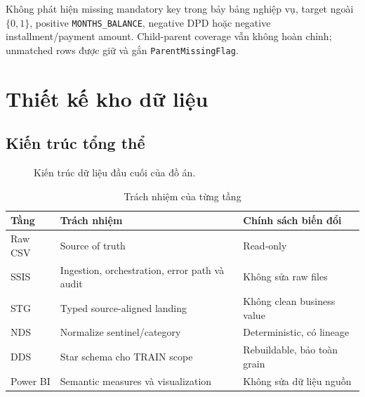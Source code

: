 \documentclass[12pt,a4paper,oneside]{report}
\begin{document}
Không phát hiện missing mandatory key trong bảy bảng nghiệp vụ, target ngoài $\{0,1\}$, positive \texttt{MONTHS\_BALANCE}, negative DPD hoặc negative installment/payment amount. Child-parent coverage vẫn không hoàn chỉnh; unmatched rows được giữ và gắn \texttt{ParentMissingFlag}.

\chapter{Thiết kế kho dữ liệu}
\section{Kiến trúc tổng thể}
\begin{figure}[H]
\centering
{}
\caption{Kiến trúc dữ liệu đầu cuối của đồ án.}
\label{fig:architecture}
\end{figure}

\begin{table}[H]
\centering
\caption{Trách nhiệm của từng tầng}\label{tab:layers}
\begin{tabularx}{\textwidth}{lXX}
\toprule
Tầng & Trách nhiệm & Chính sách biến đổi \\
\midrule
Raw CSV & Source of truth & Read-only \\
SSIS & Ingestion, orchestration, error path và audit & Không sửa raw files \\
STG & Typed source-aligned landing & Không clean business value \\
NDS & Normalize sentinel/category & Deterministic, có lineage \\
DDS & Star schema cho TRAIN scope & Rebuildable, bảo toàn grain \\
Power BI & Semantic measures và visualization & Không sửa dữ liệu nguồn \\
\bottomrule
\end{tabularx}
\end{table}
\end{document}

